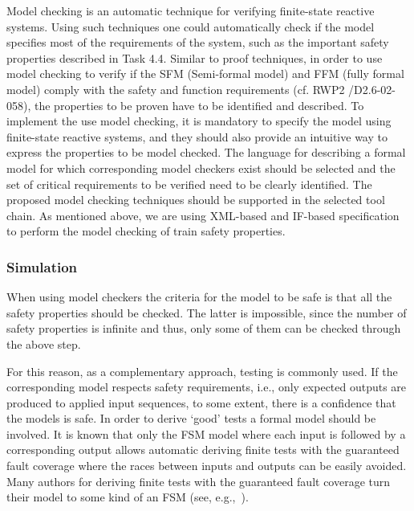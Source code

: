 \documentclass{template/openetcs_article}
\begin{document}
Model checking is an automatic technique for verifying finite-state reactive systems. Using such techniques one could automatically check if the model specifies most of the requirements of the system, such as the important safety properties described in Task 4.4. Similar to proof techniques, in order to use model checking to verify if the SFM (Semi-formal model) and FFM (fully formal model) comply with the safety and function requirements (cf. RWP2 /D2.6-02-058), the properties to be proven have to be identified and described. To implement the use model checking, it is mandatory to specify the model using finite-state reactive systems, and they should also provide an intuitive way to express the properties to be model checked. The language for describing a formal model for which corresponding model checkers exist should be selected and the set of critical requirements to be verified need to be clearly identified. The proposed model checking techniques should be supported in the selected tool chain. As mentioned above, we are using XML-based and IF-based specification to perform the model checking of train safety properties.

\subsubsection{Simulation}

When using model checkers the criteria for the model to be safe is that all the safety properties should be checked. The latter is impossible, since the number of safety properties is infinite and thus, only some of them can be checked through the above step.

For this reason, as a complementary approach, testing is commonly used. If the corresponding model respects safety requirements, i.e., only expected outputs are produced to applied input sequences, to some extent, there is a confidence that the models is safe. In order to derive ‘good’ tests a formal model should be involved. It is known that only the FSM model where each input is followed by a corresponding output allows automatic deriving finite tests with the guaranteed fault coverage where the races between inputs and outputs can be easily avoided.  Many authors for deriving finite tests with the guaranteed fault coverage turn their model to some kind of an FSM (see, e.g.,~\cite{springintveld2001testing,zymc11,Gromov2009}). 
\end{document}
